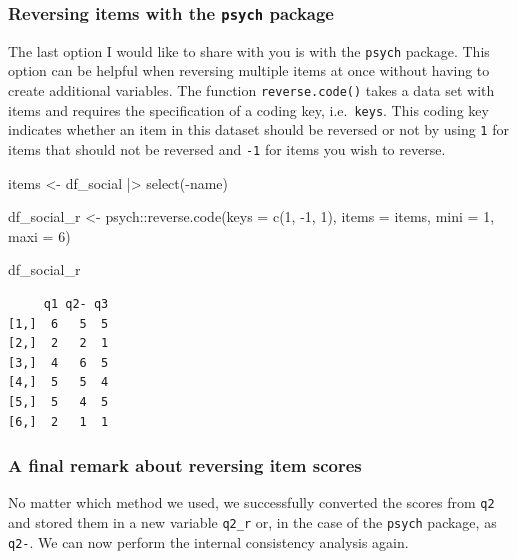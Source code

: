 \documentclass[
  letterpaper,
]{krantz}
\makeatletter
\newenvironment{Shaded}{\begin{snugshade}}{\end{snugshade}}
\newcommand{\AttributeTok}[1]{\textcolor[rgb]{0.40,0.45,0.13}{#1}}
\newcommand{\DecValTok}[1]{\textcolor[rgb]{0.68,0.00,0.00}{#1}}
\newcommand{\FunctionTok}[1]{\textcolor[rgb]{0.28,0.35,0.67}{#1}}
\newcommand{\NormalTok}[1]{\textcolor[rgb]{0.00,0.23,0.31}{#1}}
\newcommand{\OtherTok}[1]{\textcolor[rgb]{0.00,0.23,0.31}{#1}}
\newcommand{\SpecialCharTok}[1]{\textcolor[rgb]{0.37,0.37,0.37}{#1}}
\newenvironment{kframe}{%
\medskip{}
\setlength{\fboxsep}{.8em}
 \def\at@end@of@kframe{}%
 \ifinner\ifhmode%
  \def\at@end@of@kframe{\end{minipage}}%
  \begin{minipage}{\columnwidth}%
 \fi\fi%
 \def\FrameCommand##1{\hskip\@totalleftmargin \hskip-\fboxsep
 \colorbox{shadecolor}{##1}\hskip-\fboxsep
     \hskip-\linewidth \hskip-\@totalleftmargin \hskip\columnwidth}%
 \MakeFramed {\advance\hsize-\width
   \@totalleftmargin\z@ \linewidth\hsize
   \@setminipage}}%
 {\par\unskip\endMakeFramed%
 \at@end@of@kframe}
\renewenvironment{Shaded}{\begin{kframe}}{\end{kframe}}
\makeatother
\begin{document}
\subsubsection{\texorpdfstring{Reversing items with the \texttt{psych}
package}{Reversing items with the psych package}}\label{sec-reversing-items-psych}

The last option I would like to share with you is with the
\texttt{psych} package. This option can be helpful when reversing
multiple items at once without having to create additional variables.
The function \texttt{reverse.code()} takes a data set with items and
requires the specification of a coding key, i.e.~\texttt{keys}. This
coding key indicates whether an item in this dataset should be reversed
or not by using \texttt{1} for items that should not be reversed and
\texttt{-1} for items you wish to reverse.

\begin{Shaded}
\begin{Highlighting}[]
\NormalTok{items }\OtherTok{\textless{}{-}}\NormalTok{ df\_social }\SpecialCharTok{|\textgreater{}} \FunctionTok{select}\NormalTok{(}\SpecialCharTok{{-}}\NormalTok{name)}

\NormalTok{df\_social\_r }\OtherTok{\textless{}{-}}\NormalTok{ psych}\SpecialCharTok{::}\FunctionTok{reverse.code}\NormalTok{(}\AttributeTok{keys =} \FunctionTok{c}\NormalTok{(}\DecValTok{1}\NormalTok{, }\SpecialCharTok{{-}}\DecValTok{1}\NormalTok{, }\DecValTok{1}\NormalTok{),}
                      \AttributeTok{items =}\NormalTok{ items,}
                      \AttributeTok{mini =} \DecValTok{1}\NormalTok{,}
                      \AttributeTok{maxi =} \DecValTok{6}\NormalTok{)}

\NormalTok{df\_social\_r}
\end{Highlighting}
\end{Shaded}

\begin{verbatim}
     q1 q2- q3
[1,]  6   5  5
[2,]  2   2  1
[3,]  4   6  5
[4,]  5   5  4
[5,]  5   4  5
[6,]  2   1  1
\end{verbatim}

\subsubsection{A final remark about reversing item
scores}\label{sec-reversing-items-final-remark}

No matter which method we used, we successfully converted the scores
from \texttt{q2} and stored them in a new variable \texttt{q2\_r} or, in
the case of the \texttt{psych} package, as \texttt{q2-}. We can now
perform the internal consistency analysis again.
\end{document}
